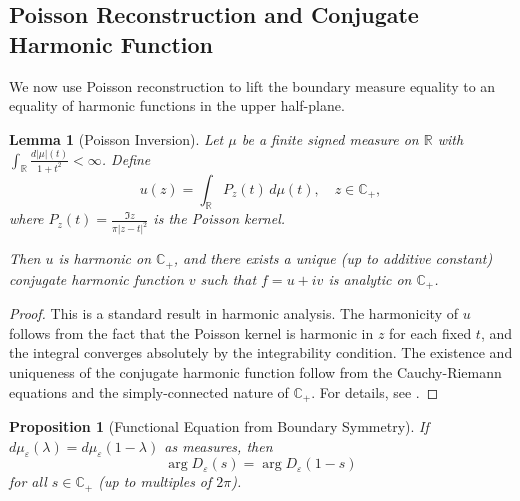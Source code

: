 ﻿\documentclass[12pt,a4paper]{article}
\newtheorem{lemma}[theorem]{Lemma}
\newtheorem{proposition}[theorem]{Proposition}
\theoremstyle{definition}
\theoremstyle{remark}
\newcommand{\CC}{\mathbb{C}}
\newcommand{\RR}{\mathbb{R}}
\begin{document}
\subsection{Poisson Reconstruction and Conjugate Harmonic Function}

We now use Poisson reconstruction to lift the boundary measure equality to an equality of harmonic functions in the upper half-plane.

\begin{lemma}[Poisson Inversion]
\label{lem:poisson-inversion}
Let $\mu$ be a finite signed measure on $\RR$ with $\int_\RR \frac{d|\mu|(t)}{1+t^2} < \infty$. Define
\[
u(z) = \int_\RR P_z(t) \, d\mu(t), \quad z \in \CC_+,
\]
where $P_z(t) = \frac{\Im z}{\pi|z-t|^2}$ is the Poisson kernel.

Then $u$ is harmonic on $\CC_+$, and there exists a unique (up to additive constant) conjugate harmonic function $v$ such that $f = u + iv$ is analytic on $\CC_+$.
\end{lemma}

\begin{proof}
This is a standard result in harmonic analysis. The harmonicity of $u$ follows from the fact that the Poisson kernel is harmonic in $z$ for each fixed $t$, and the integral converges absolutely by the integrability condition. The existence and uniqueness of the conjugate harmonic function follow from the Cauchy-Riemann equations and the simply-connected nature of $\CC_+$. For details, see \cite[Thm.~11.9]{Rudin1987}.
\end{proof}

\begin{proposition}[Functional Equation from Boundary Symmetry]
\label{prop:functional-equation-from-symmetry}
If $d\mu_\varepsilon(\lambda) = d\mu_\varepsilon(1-\lambda)$ as measures, then
\[
\arg D_\varepsilon(s) = \arg D_\varepsilon(1-s)
\]
for all $s \in \CC_+$ (up to multiples of $2\pi$).
\end{proposition}
\end{document}
